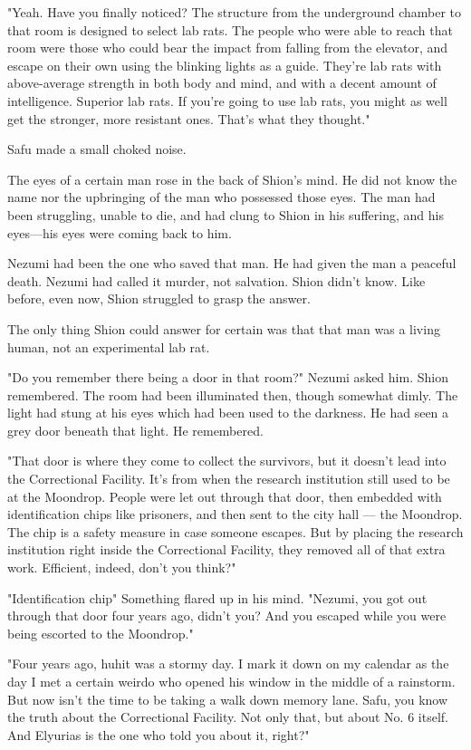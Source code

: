 "Yeah. Have you finally noticed? The structure from the underground
chamber to that room is designed to select lab rats. The people who were
able to reach that room were those who could bear the impact from
falling from the elevator, and escape on their own using the blinking
lights as a guide. They're lab rats with above-average strength in both
body and mind, and with a decent amount of intelligence. Superior lab
rats. If you're going to use lab rats, you might as well get the
stronger, more resistant ones. That's what they thought."

Safu made a small choked noise.

The eyes of a certain man rose in the back of Shion's mind. He did not
know the name nor the upbringing of the man who possessed those eyes.
The man had been struggling, unable to die, and had clung to Shion in
his suffering, and his eyes---his eyes were coming back to him.

Nezumi had been the one who saved that man. He had given the man a
peaceful death. Nezumi had called it murder, not salvation. Shion didn't
know. Like before, even now, Shion struggled to grasp the answer.

The only thing Shion could answer for certain was that that man was a
living human, not an experimental lab rat.

"Do you remember there being a door in that room?" Nezumi asked him.
Shion remembered. The room had been illuminated then, though somewhat
dimly. The light had stung at his eyes which had been used to the
darkness. He had seen a grey door beneath that light. He remembered.

"That door is where they come to collect the survivors, but it doesn't
lead into the Correctional Facility. It's from when the research
institution still used to be at the Moondrop. People were let out
through that door, then embedded with identification chips like
prisoners, and then sent to the city hall --- the Moondrop. The chip is a
safety measure in case someone escapes. But by placing the research
institution right inside the Correctional Facility, they removed all of
that extra work. Efficient, indeed, don't you think?"

"Identification chip\el " Something flared up in his mind. "Nezumi, you
got out through that door four years ago, didn't you? And you escaped
while you were being escorted to the Moondrop."

"Four years ago, huh\el it was a stormy day. I mark it down on my
calendar as the day I met a certain weirdo who opened his window in the
middle of a rainstorm. But now isn't the time to be taking a walk down
memory lane. Safu, you know the truth about the Correctional Facility.
Not only that, but about No. 6 itself. And Elyurias is the one who told
you about it, right?"

